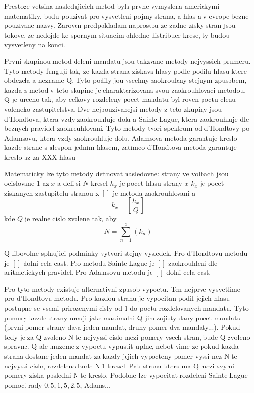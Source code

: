 \documentclass[12pt,a4paper]{article}
\begin{document}
Prestoze vetsina nasledujicich metod byla prvne vymyslena americkymi matematiky, budu pouzivat pro vysvetleni pojmy strana, a hlas a v evrope bezne pouzivane nazvy. Zaroven predpokladam naprostou ze zadne zisky stran jsou tokove, ze nedojde ke spornym situacim ohledne distribuce krese, ty budou vysvetleny na konci. 

Prvni skupinou metod deleni mandatu jsou takzvane metody nejvyssich prumeru. Tyto metody funguji tak, ze kazda strana ziskava hlasy podle podilu hlasu ktere obdezela a nezname Q. Tyto podily jou vsechny zaokrouleny stejnym zpusobem, kazda z metod v teto skupine je charakterizovana svou zaokrouhlovaci metodou. Q je urceno tak, aby celkovy rozdeleny pocet mandatu byl roven poctu clenu voleneho zastupitelstva. Dve nejpouzivanejsi metody z teto zkupiny jsou d'Hondtova, ktera vzdy zaokrouhluje dolu a Sainte-Lague, ktera zaokrouhluje dle beznych pravidel zaokrouhlovani. Tyto metody tvori spektrum od d'Hondtovy po Adamsovu, ktera vzdy zaokrouhluje dolu. Adamsova metoda garantuje kreslo kazde strane s alespon jednim hlasem, zatimco d'Hondtova metoda garantuje kreslo az za XXX hlasu.

Matematicky lze tyto metody definovat nasledovne:
strany ve volbach jsou ocislovane $1$ az $x$ a deli si $N$ kresel
$h_{x}$ je pocet hlasu strany $x$
$k_{x}$ je pocet ziskanych zastupitelu stranou x
$[]$ je metoda zaokrouhlovani
a
$$k_{x}=[\dfrac{h_{x}}{Q}]$$ kde $Q$ je realne cislo zvolene tak, aby $$N=\sum_{n=1}^{x} (k_{n})$$ 

Q libovolne splnujici podminky vytvori stejny vysledek. %
Pro d'Hondtovu metodu je $[]$ dolni cela cast.
Pro metodu Sainte-Lague je $[]$ zaokrouhleni dle aritmetickych pravidel.
Pro Adamsovu metodu je $[]$ dolni cela cast.

Pro tyto metody existuje alternativni zpusob vypoctu. Ten nejprve vysvetlime pro d'Hondtovu metodu. Pro kazdou stranu je vypocitan podil jejich hlasu postupne se vsemi prirozenymi cisly od 1 do poctu rozdelovanych mandatu. Tyto pomery kazde strany urcuji jake maximalni Q jim zajisty dany pocet mandatu (prvni pomer strany dava jeden mandat, druhy pomer dva mandaty...). Pokud tedy je za Q zvoleno N-te nejvyssi cislo mezi pomery vsech stran, bude Q zvoleno spravne. Q ale muzeme z vypoctu vypustit uplne, nebot vime ze pokud kazda strana dostane jeden mandat za kazdy jejich vypocteny pomer vyssi nez N-te nejvyssi cislo, rozdeleno bude N-1 kresel. Pak strana ktera ma Q mezi svymi pomery ziska posledni N-te kreslo.
Podobne lze vypocitat rozdeleni Sainte Lague pomoci rady $0{,}5, 1{,}5, 2{,}5$, Adams... %
\end{document}
